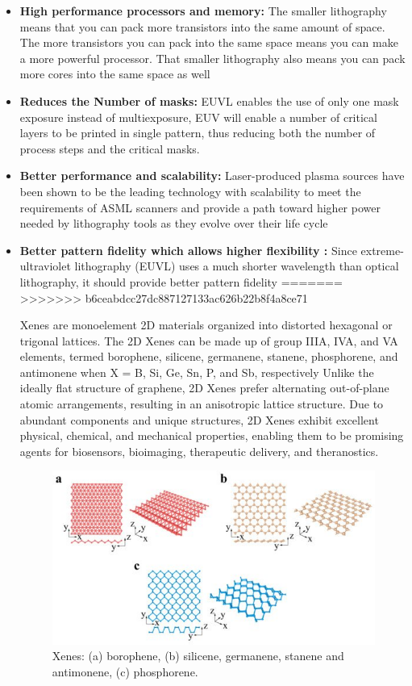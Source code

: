 \documentclass[12pt,a4paper]{report}
\begin{document}
\begin{itemize}
  \item \textbf{High performance processors and memory: }The smaller 
  lithography means that you can pack more transistors into the 
  same amount of space. The more transistors you can pack into 
  the same space means you can make a more powerful processor. 
  That smaller lithography also means you can pack more 
  cores into the same space as well

  \item \textbf{Reduces the Number of masks: }EUVL enables the use 
  of only one mask exposure instead of multiexposure, EUV will 
  enable a number of critical layers to be printed in single 
  pattern, thus reducing both the number of process steps and 
  the critical masks.
  \item \textbf{Better performance and scalability: }Laser-produced 
  plasma sources have been shown to be the leading technology with 
  scalability to meet the requirements of ASML scanners and 
  provide a path toward higher power needed by lithography tools 
  as they evolve over their life cycle
  
  \item \textbf{Better pattern fidelity which allows higher flexibility : }Since extreme-ultraviolet lithography (EUVL) uses a much shorter wavelength than optical lithography, it should provide better pattern fidelity
=======
>>>>>>> b6ceabdcc27dc887127133ac626b22b8f4a8ce71

  Xenes are monoelement 2D materials organized into distorted hexagonal or trigonal lattices. The 2D Xenes can be made up of group IIIA, IVA, and VA elements, termed borophene, silicene, germanene, stanene, phosphorene, and antimonene when X = B, Si, Ge, Sn, P, and Sb, respectively Unlike the ideally flat structure of graphene, 2D Xenes prefer alternating out-of-plane atomic arrangements, resulting in an anisotropic lattice structure. Due to abundant components and unique structures, 2D Xenes exhibit excellent physical, chemical, and mechanical properties, enabling them to be promising agents for biosensors, bioimaging, therapeutic delivery, and theranostics.
  \begin{figure}
    \centering
    \includegraphics[scale=0.3]{2.2.jpg}
    \caption{Xenes: (a) borophene, (b) silicene, germanene, stanene and antimonene, (c) phosphorene.}
    \label{xenefam}
    \end{figure}
  

\end{itemize}
\end{document}

